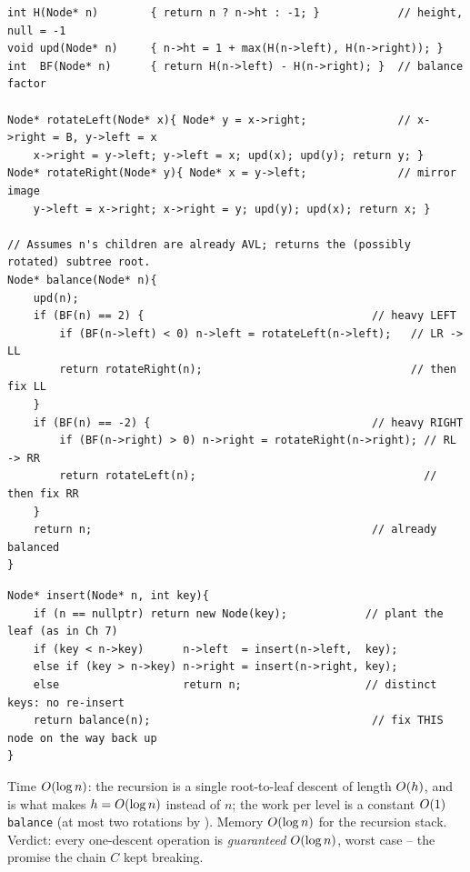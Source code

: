 \begin{lstlisting}[caption={Balance factors and the four-case repair -- the reuse of Section 8.1's rotations with height upkeep}, label={lst:c06-avlrot}]
int H(Node* n)        { return n ? n->ht : -1; }            // height, null = -1
void upd(Node* n)     { n->ht = 1 + max(H(n->left), H(n->right)); }
int  BF(Node* n)      { return H(n->left) - H(n->right); }  // balance factor

Node* rotateLeft(Node* x){ Node* y = x->right;              // x->right = B, y->left = x
    x->right = y->left; y->left = x; upd(x); upd(y); return y; }
Node* rotateRight(Node* y){ Node* x = y->left;              // mirror image
    y->left = x->right; x->right = y; upd(y); upd(x); return x; }

// Assumes n's children are already AVL; returns the (possibly rotated) subtree root.
Node* balance(Node* n){
    upd(n);
    if (BF(n) == 2) {                                   // heavy LEFT
        if (BF(n->left) < 0) n->left = rotateLeft(n->left);   // LR -> LL
        return rotateRight(n);                                // then fix LL
    }
    if (BF(n) == -2) {                                  // heavy RIGHT
        if (BF(n->right) > 0) n->right = rotateRight(n->right); // RL -> RR
        return rotateLeft(n);                                   // then fix RR
    }
    return n;                                           // already balanced
}
\end{lstlisting}

\begin{lstlisting}[caption={AVL insertion -- Chapter 7's insert plus one balance call on the return path}, label={lst:c06-avlins}]
Node* insert(Node* n, int key){
    if (n == nullptr) return new Node(key);            // plant the leaf (as in Ch 7)
    if (key < n->key)      n->left  = insert(n->left,  key);
    else if (key > n->key) n->right = insert(n->right, key);
    else                   return n;                   // distinct keys: no re-insert
    return balance(n);                                  // fix THIS node on the way back up
}
\end{lstlisting}

\begin{complexitybox}
Time $O(\log n)$: the recursion is a single root-to-leaf descent of length $O(h)$, and
 is what makes $h=O(\log n)$ instead of $n$; the work per level is a constant
$O(1)$ \texttt{balance} (at most two rotations by ). Memory $O(\log n)$ for
the recursion stack. Verdict: every one-descent operation is \emph{guaranteed} $O(\log n)$, worst
case -- the promise the chain $C$ kept breaking.
\end{complexitybox}

